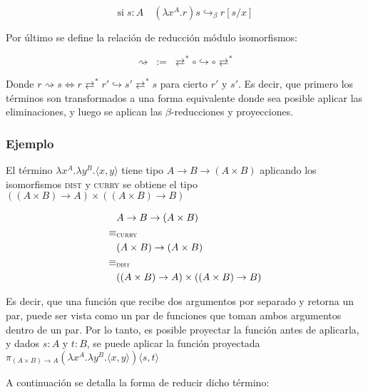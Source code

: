 \[ \text{si} \; s:A \quad (\lambda x^A.r) s \hookrightarrow_{\beta} r[s/x] \]


Por último se define la relación de reducción módulo isomorfismos:

\[ \rightsquigarrow \; := \; \rightleftarrows^* \circ \hookrightarrow \circ \rightleftarrows^* \]

Donde $r \rightsquigarrow s \iff r \rightleftarrows^* r' \hookrightarrow s' \rightleftarrows^* s$ para cierto $r'$ y $s'$. Es decir, que primero los términos son transformados a una forma equivalente donde sea posible aplicar las eliminaciones, y luego se aplican las $\beta$-reducciones y proyecciones.

\subsubsection{Ejemplo}
El término $\lambda x^A . \lambda y^B . \langle x,y \rangle$ tiene tipo $A \rightarrow B \rightarrow (A \times B)$ aplicando los isomorfismos \textsc{dist} y \textsc{curry} se obtiene el tipo $((A \times B) \rightarrow A) \times ((A \times B) \rightarrow B)$

\begin{align*}
	&A \rightarrow B \rightarrow (A \times B) \\
	\equiv&_\textsc{curry} \\
	&(A \times B) \rightarrow (A \times B) \\
	\equiv&_\textsc{dist} \\
	&((A \times B) \rightarrow A) \times ((A \times B) \rightarrow B)
\end{align*}

Es decir, que una función que recibe dos argumentos por separado y retorna un par, puede ser vista como un par de funciones que toman ambos argumentos dentro de un par.
Por lo tanto, es posible proyectar la función antes de aplicarla, y dados $s: A$ y $t: B$, se puede aplicar la función proyectada $\pi_{(A \times B) \rightarrow A}(\lambda x^A . \lambda y^B . \langle x,y \rangle) \langle s,t \rangle$

A continuación se detalla la forma de reducir dicho término:

